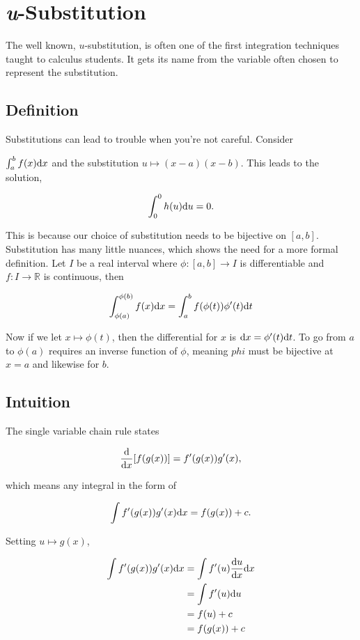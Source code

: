 \section{\textit{u}-Substitution} \label{sec:usubstitution}
The well known, $u$-substitution, is often one of the first integration techniques taught to calculus students. It gets its name from the variable often chosen to represent the substitution.

\subsection*{Definition} 
Substitutions can lead to trouble when you're not careful. Consider 

$\int_a^b f(x)\textrm{d}x$ and the substitution $u\mapsto (x-a)(x-b)$. This leads to the solution,

$$ \int_0^0 h(u) \textrm{d}u = 0.$$

This is because our choice of substitution needs to be bijective on $[a,b]$. Substitution has many little nuances, which shows the need for a more formal definition. Let $I$ be a real interval where $\phi : [a,b] \to I$ is differentiable and $f : I \to \mathbb R$ is continuous, then

$$ \int_{\phi(a)}^{\phi(b)} f(x) \textrm{d}x = \int_a^b f(\phi(t))\phi'(t) \textrm{d}t $$

Now if we let $x \mapsto \phi(t)$, then the differential for $x$ is $\textrm{d}x = \phi'(t) \textrm{d}t$. To go from $a$ to $\phi(a)$ requires an inverse function of $\phi$, meaning $phi$ must be bijective at $x=a$ and likewise for $b$.

\subsection*{Intuition} 
The single variable chain rule states

$$ \frac{\textrm{d}}{\textrm{d}x}[f(g(x))] = f'(g(x))g'(x), $$

\noindent which means any integral in the form of 

$$ \int f'(g(x))g'(x) \textrm{d}x = f(g(x))+c . $$

\noindent Setting $u \mapsto g(x)$,

\begin{align*}
    \int f'(g(x))g'(x) \textrm{d}x &= \int f'(u)\frac{\textrm{d}u}{\textrm{d}x} \textrm{d}x\\
    &= \int f'(u) \textrm{d}u \\
    &= f(u)+c \\
    &= f(g(x))+c \\
\end{align*} 


